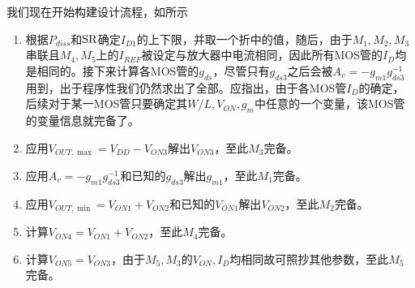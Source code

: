 我们现在开始构建设计流程，如所示
\begin{enumerate}
    \item 根据$P_{diss}$和$\text{SR}$确定$I_{D1}$的上下限，并取一个折中的值，随后，由于$M_1,M_2,M_3$串联且$M_4,M_5$上的$I_{REF}$被设定与放大器中电流相同，因此所有MOS管的$I_D$均是相同的。接下来计算各MOS管的$g_{ds}$，尽管只有$g_{ds3}$之后会被$A_v=-g_{m1}g_{ds3}^{-1}$用到，出于程序性我们仍然求出了全部。应指出，由于各MOS管$I_D$的确定，后续对于某一MOS管只要确定其$W/L,V_{ON},g_m$中任意的一个变量，该MOS管的变量信息就完备了。
    \item 应用$V_{OUT,\max}=V_{DD}-V_{ON3}$解出$V_{ON3}$，至此$M_3$完备。
    \item 应用$A_{v}=-g_{m1}g_{ds3}^{-1}$和已知的$g_{ds3}$解出$g_{m1}$，至此$M_1$完备。
    \item 应用$V_{OUT,\min}=V_{ON1}+V_{ON2}$和已知的$V_{ON1}$解出$V_{ON2}$，至此$M_2$完备。
    \item 计算$V_{ON4}=V_{ON1}+V_{ON2}$，至此$M_4$完备。
    \item 计算$V_{ON5}=V_{ON3}$，由于$M_5,M_3$的$V_{ON},I_D$均相同故可照抄其他参数，至此$M_5$完备。
\end{enumerate}
